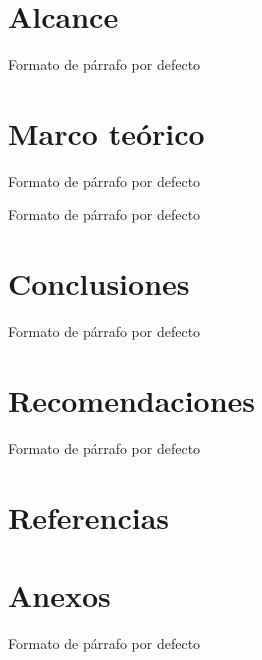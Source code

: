 \documentclass[11pt, letterpaper]{report}
\newcommand{\defaultparformat}[1]{
	{\setlength{\parskip}{2ex}
     }
}
\def \parpordefecto {Formato de párrafo por defecto}
\begin{document}
\ifdefined\CAPalcance
    \newpage
	\chapter{Alcance}
	\ifdefined\parpordefecto
    	\defaultparformat{h-hipotesis-definicion-alcance}
    \else
    	
    \fi
\fi

\ifdefined\CAPmarcoteorico
	\newpage
	\chapter{Marco teórico}
	\ifdefined\parpordefecto
		\defaultparformat{i-marco_teorico}
	\else
		
	\fi
\fi

\newpage
\ifdefined\parpordefecto
	\defaultparformat{j-capitulos}
\else
	
\fi

\ifdefined\CAPconclusiones
	\newpage
	\chapter{Conclusiones}
	\ifdefined\parpordefecto
		\defaultparformat{k-conclusiones}
	\else
		
	\fi
\fi

\ifdefined\CAPrecomendaciones
	\newpage
	\chapter{Recomendaciones}
	\ifdefined\parpordefecto
		\defaultparformat{l-recomendaciones}
	\else
		
	\fi
\fi

\ifdefined\CAPbibliografia
	\newpage
    \cleardoublepage{}
    \renewcommand{\bibname}{Referencias}
	\chapter{\bibname}
    \printbibliography[heading=none]
\fi

\ifdefined\CAPanexos
	\newpage
	\chapter{Anexos}
	\ifdefined\parpordefecto
		\defaultparformat{n-anexos}
	\else
		
	\fi
\fi

\ifdefined\CAPglosario
	\newpage
	\printglossary
\fi
\end{document}
